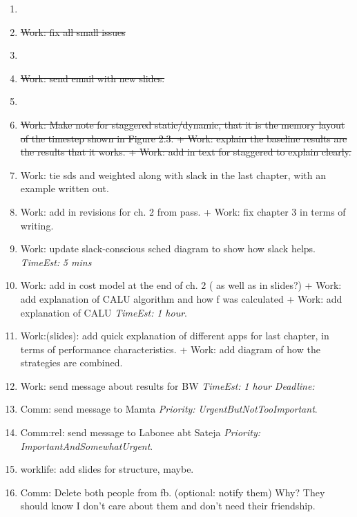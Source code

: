 \documentclass[11pt]{article}
\newcommand{\doneTask}[1]{\item \sout{#1}}
\newcommand{\te}[1]{\textit{TimeEst:} \textit{#1}}
\newcommand{\priority}[1]{\textit{Priority:} \textit{#1}}
\newcommand{\dl}[1]{\textit{Deadline:}#1}
\begin{document}
\begin{enumerate}
\item \doneTask{Work: fix all small issues }

\item \doneTask{Work: send email with new slides. }

\item \doneTask{Work: Make note for staggered static/dynamic, that it is the
  memory layout of the timestep shown in Figure 2.3. + Work: explain
  the baseline results are the results that it works. + Work: add in
  text for staggered to explain clearly.}

\item Work: tie sds and weighted along with slack in the last chapter, with an example written out. 

\item Work: add in revisions for ch. 2 from pass.  + Work: fix chapter 3 in terms of writing.  

\item Work: update slack-conscious sched diagram to show how slack helps. \te{5 mins} 

\item Work: add in cost model at the end of ch. 2 ( as well as in
  slides?)  + Work: add explanation of CALU algorithm and how f was
  calculated  + Work: add explanation of CALU \te{1 hour}. 


\item Work:(slides): add quick explanation of different apps for last
  chapter, in terms of performance characteristics.  + Work: add
  diagram of how the strategies are combined. 



\item Work: send message about results for BW \te{ 1 hour} \dl{}  








\item Comm: send message to Mamta \priority{UrgentButNotTooImportant}. 
\item Comm:rel: send message to Labonee abt Sateja \priority{ImportantAndSomewhatUrgent}. 







\item worklife: add slides for structure, maybe. 
\item Comm: Delete both people from fb. (optional: notify them) Why? They should know I don't
  care about them and don't need their friendship.  

\end{enumerate}
 
\end{document}
